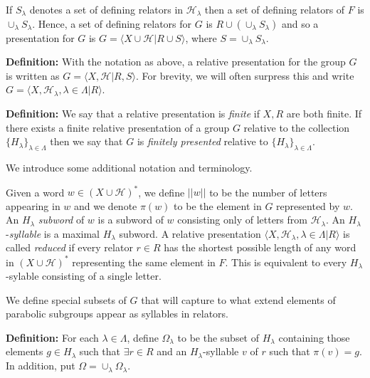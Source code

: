 \documentclass[12pt]{article}
\newcommand{\vs}{\vskip10pt}
\begin{document}
	\vs 
	
	If $S_{\lambda}$ denotes a set of defining relators in $\mathcal{H}_{\lambda}$ then a set of defining relators of $F$ is $\cup_{\lambda} S_{\lambda}$. Hence, a set of defining relators for $G$ is $R \cup (\cup_{\lambda} S_{\lambda})$ and so a presentation for $G$ is $G = \langle X \cup \mathcal{H} \vert R \cup S \rangle$, where $S = \cup_{\lambda} S_{\lambda}$. 
	
	\vs 
	
	\textbf{Definition: } With the notation as above, a relative presentation for the group $G$ is written as $G = \langle X, \mathcal{H} \vert R, S \rangle$. For brevity, we will often surpress this and write $G = \langle X, \mathcal{H}_{\lambda}, \lambda \in \Lambda \vert R \rangle$. 
	
	\vs 
	
	\textbf{Definition: } We say that a relative presentation is \textit{finite} if $X,R$ are both finite. If there exists a finite relative presentation of a group $G$ relative to the collection $\{H_{\lambda}\}_{\lambda \in \Lambda}$ then we say that $G$ is \textit{finitely presented} relative to $\{H_{\lambda}\}_{\lambda \in \Lambda}$. 
	
	\vs
	
	We introduce some additional notation and terminology. 
	
	\vs 
	
	Given a word $w \in (X \cup \mathcal{H})^*$, we define $\vert \vert w \vert \vert$ to be the number of letters appearing in $w$ and we denote $\pi(w)$ to be the element in $G$ represented by $w$. An $H_{\lambda}$ \textit{subword} of $w$ is a subword of $w$ consisting only of letters from $\mathcal{H}_{\lambda}$. An $H_{\lambda}$-\textit{syllable} is a maximal $H_{\lambda}$ subword. A relative presentation $\langle X, \mathcal{H}_{\lambda}, \lambda \in \Lambda \vert R \rangle $ is called \textit{reduced} if every relator $r \in R$ has the shortest possible length of any word in $(X \cup \mathcal{H})^*$ representing the same element in $F$. This is equivalent to every $H_{\lambda}$-sylable consisting of a single letter. 
	
	\vs 
	
	We define special subsets of $G$ that will capture to what extend elements of parabolic subgroups appear as syllables in relators.
	
	\vs 
	
	\textbf{Definition: } For each $\lambda \in \Lambda$, define $\Omega_{\lambda}$ to be the subset of $H_{\lambda}$ containing those elements $g \in H_{\lambda}$ such that $\exists r \in R$ and an $H_{\lambda}$-syllable $v$ of $r$ such that $\pi(v) = g$. In addition, put $\Omega = \cup_{\lambda} \Omega_{\lambda}$. 
	
\end{document}
